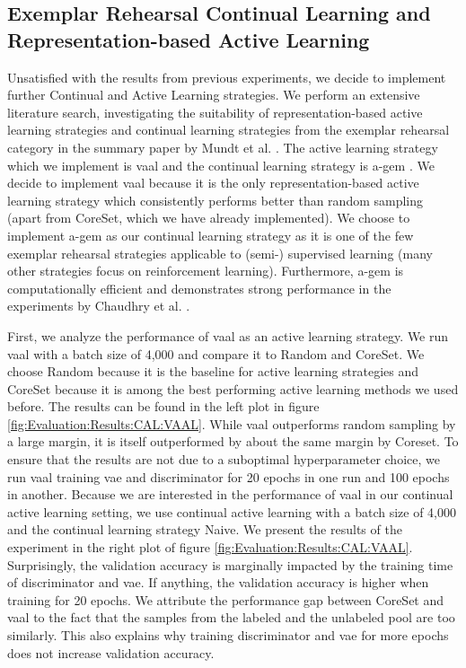 \subsection{Exemplar Rehearsal Continual Learning and Representation-based Active Learning}
\label{sec:Evaluation:Results:CAL:VAAL_AGEM}
Unsatisfied with the results from previous experiments, we decide to implement further Continual and Active Learning strategies. We perform an extensive literature search,
investigating the suitability of representation-based active learning strategies and continual learning strategies from the exemplar rehearsal category in the summary paper
by Mundt et al. \cite{mundt2020wholistic}. The active learning strategy which we implement is \gls{vaal} \cite{sinha2019variational} and the continual learning strategy is
\gls{a-gem} \cite{chaudhry2018efficient}. We decide to implement \gls{vaal} because it is the only representation-based active learning strategy which consistently performs
better than random sampling (apart from CoreSet, which we have already implemented). We choose to implement \gls{a-gem} as our continual learning strategy as it
is one of the few exemplar rehearsal strategies applicable to (semi-) supervised learning (many other strategies focus on reinforcement learning). Furthermore, \gls{a-gem}
is computationally efficient and demonstrates strong performance in the experiments by Chaudhry et al. \cite{chaudhry2018efficient}. \par
First, we analyze the performance of \gls{vaal} as an active learning strategy. We run \gls{vaal} with a batch size of 4,000 and compare it to Random and CoreSet. We choose
Random because it is the baseline for active learning strategies and CoreSet because it is among the best performing active learning methods we used before. The results can be
found in the left plot in figure \ref{fig:Evaluation:Results:CAL:VAAL}. While \gls{vaal} outperforms random sampling by a large margin, it is itself outperformed by about the
same margin by Coreset. To ensure that the results are not due to a suboptimal hyperparameter choice, we run \gls{vaal} training \gls{vae} and discriminator for 20 epochs in
one run and 100 epochs in another. Because we are interested in the performance of \gls{vaal} in our continual active learning setting, we use continual active learning with
a batch size of 4,000 and the continual learning strategy Naive. We present the results of the experiment in the right plot of figure \ref{fig:Evaluation:Results:CAL:VAAL}.
Surprisingly, the validation accuracy is marginally impacted by the training time of discriminator and \gls{vae}. If anything, the validation accuracy is higher when training for
20 epochs. We attribute the performance gap between CoreSet and \gls{vaal} to the fact that the samples from the labeled and the unlabeled pool are too similarly. This also
explains why training discriminator and \gls{vae} for more epochs does not increase validation accuracy. \par


